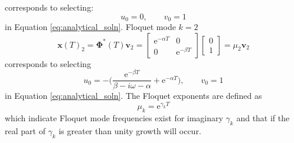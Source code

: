\documentclass{article}
\begin{document}
 corresponds to selecting:
 \begin{equation}
  u_0=0,\qquad v_0=1
 \end{equation}
 in Equation \ref{eq:analytical_soln}.%
Floquet mode $k=2$
 \begin{equation}
  \mathbf{x}(T)_2=\boldsymbol{\Phi}^*(T)\mathbf{v}_2=\begin{bmatrix*}
  \mathrm{e}^{-\alpha{T}} & 0 \\
  0 & \mathrm{e}^{-\beta{T}}
 \end{bmatrix*}
 \begin{bmatrix*}
  0 \\
  1 
 \end{bmatrix*}
 =\mu_2\mathbf{v}_2
 \end{equation}
corresponds to selecting
\begin{equation}
 u_0=-\Big(\frac{\mathrm{e}^{-\beta{T}}}{\beta-i\omega-\alpha}+\mathrm{e}^{-\alpha{T}}\Big), \qquad v_0=1
\end{equation}
in Equation \ref{eq:analytical_soln}.%
The Floquet exponents are defined as 
\begin{equation*}
 \mu_k=\mathrm{e}^{\gamma_k{T}}
\end{equation*}
which indicate Floquet mode frequencies exist for imaginary $\gamma_k$ and 
that if the real part of $\gamma_k$ is greater than unity growth will occur.
\end{document}
